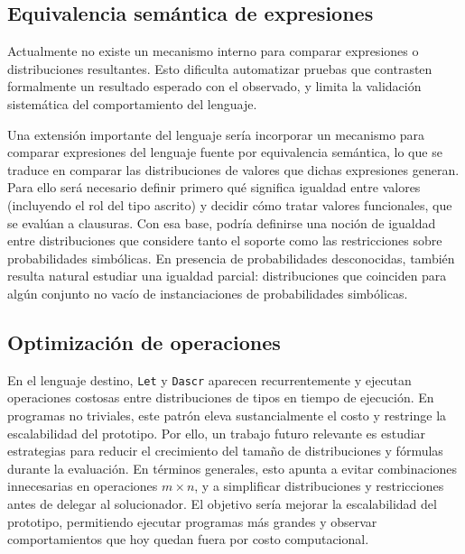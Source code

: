 \subsection{Equivalencia semántica de expresiones}
 Actualmente no existe un mecanismo interno para comparar
  expresiones o distribuciones resultantes. Esto dificulta automatizar
  pruebas que contrasten formalmente un resultado esperado con el
  observado, y limita la validación sistemática del comportamiento del
  lenguaje.

Una extensión importante del lenguaje sería
incorporar un mecanismo para comparar expresiones
del lenguaje fuente por equivalencia semántica, lo
que se traduce en comparar las distribuciones de
valores que dichas expresiones generan. Para ello
será necesario definir primero qué significa
igualdad entre valores (incluyendo el rol del tipo
ascrito) y decidir cómo tratar valores
funcionales, que se evalúan a clausuras. Con esa
base, podría definirse una noción de igualdad
entre distribuciones que considere tanto el
soporte como las restricciones sobre
probabilidades simbólicas. En presencia de
probabilidades desconocidas, también resulta natural estudiar
una igualdad parcial: distribuciones
que coinciden para algún conjunto no vacío de
instanciaciones de probabilidades simbólicas.




\subsection{Optimización de operaciones}  En el lenguaje
  destino, \lstinline|Let| y \lstinline|Dascr| aparecen
  recurrentemente y ejecutan operaciones costosas entre distribuciones
  de tipos en tiempo de ejecución. En programas no triviales, este
  patrón eleva sustancialmente el costo y restringe la escalabilidad
  del prototipo.  Por ello, un trabajo futuro relevante es estudiar
  estrategias para reducir el crecimiento del tamaño de distribuciones
  y fórmulas durante la evaluación. En términos generales, esto apunta
  a evitar combinaciones innecesarias en operaciones $m\times n$, y a
  simplificar distribuciones y restricciones antes de delegar al
  solucionador. El objetivo sería mejorar la escalabilidad del prototipo,
  permitiendo ejecutar programas más grandes y observar
  comportamientos que hoy quedan fuera por costo computacional.

